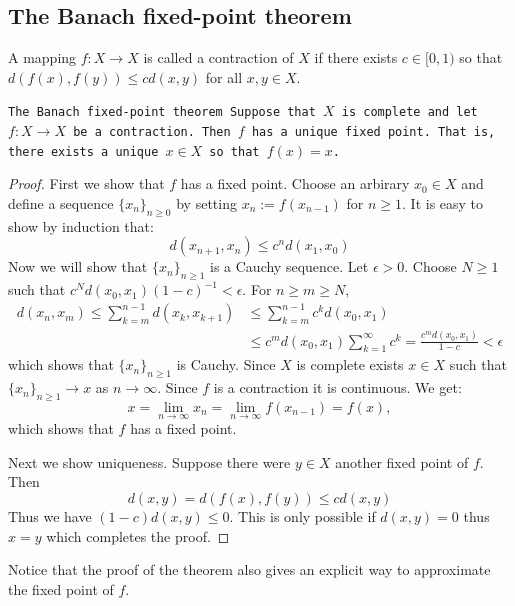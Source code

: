 \documentclass[11pt,a4paper]{article}
\begin{document}
\subsection{The Banach fixed-point theorem}

\begin{definition}[Contraction]
  A mapping $f \colon X \to X$ is called a contraction of $X$ if there 
  exists $c \in [0, 1)$ so that $d(f(x),f(y)) \le cd(x,y)$ for all 
  $x,y \in X$.
\end{definition}

\begin{theorem}
  \tt{The Banach fixed-point theorem}
  Suppose that $X$ is complete
  and let $f \colon X \to X$ be a contraction. Then $f$ has a unique fixed 
  point. That is, there exists a unique $x \in X$ so that $f(x) = x$.
\end{theorem}
\begin{proof}
  First we show that $f$ has a fixed point. Choose an arbirary $x_0 \in X$
  and define a sequence $\{x_n\}_{n \geq 0}$ by setting
  $x_n := f(x_{n-1})$ for $n \geq 1$. It is easy to show by induction
  that:
  \[
    d(x_{n+1},x_{n}) \le c^n d(x_1,x_0)
  \]
  Now we will show that $\{x_n\}_{n \geq 1}$ is a Cauchy sequence.
  Let $\epsilon > 0$. Choose $N \geq 1$ such that
  $c^N d(x_0,x_1) (1-c)^{-1} < \epsilon$. For $n \geq m \geq N$,
  \begin{align*}
    d(x_n,x_m) \le 
    \sum_{k=m}^{n-1}{d(x_{k},x_{k+1})} &\le 
    \sum_{k=m}^{n-1}{c^k d(x_{0},x_{1})} \\ &\le
    c^m d(x_0,x_1) \sum_{k=1}^{\infty}{c^k} =
    \frac{c^m d(x_0,x_1)}{1-c} < \epsilon
  \end{align*}
  which shows that $\{x_n\}_{n \geq 1}$ is Cauchy. Since $X$ is complete
  exists $x \in X$ such that $\{x_n\}_{n \geq 1} \to x$ as $n \to \infty$.
  Since $f$ is a contraction it is continuous. We get:
  \[
    x = \lim_{n\to\infty}{x_n} = \lim_{n \to \infty}{f(x_{n-1})} = f(x),
  \]
  which shows that $f$ has a fixed point.
  
  Next we show uniqueness. Suppose there were $y \in X$ another fixed
  point of $f$. Then
  \[
    d(x,y) = d(f(x),f(y)) \le cd(x,y)
  \]
  Thus we have $(1-c)d(x,y) \le 0$. This is only possible if $d(x,y)=0$
  thus $x=y$ which completes the proof.
\end{proof}

Notice that the proof of the theorem also gives an explicit way to 
approximate the fixed point of $f$.
\end{document}

